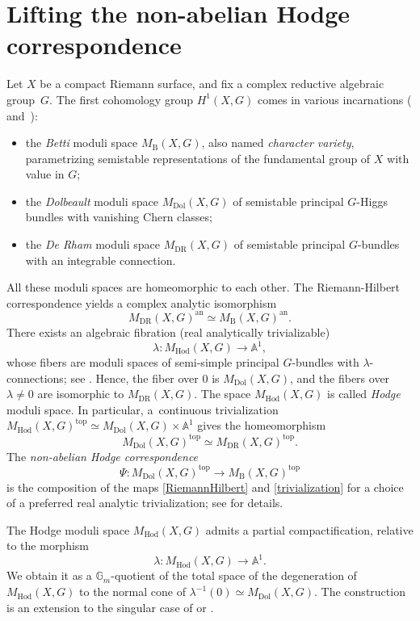\documentclass[JEP,XML,SOM,Unicode, NoEqCountersInSection,NoFloatCountersInSection,published]{cedram}
\theoremstyle{definition}
\newcommand{\Aff}{\mathbb{A}}
\newcommand{\Gm}{\mathbb{G}_m}
\newcommand{\MDolG}{{M}_{\mathrm{Dol}}(X,G)}
\newcommand{\MBG}{{M}_{\mathrm{B}}(X,G)}
\newcommand{\MDRG}{{M}_{\mathrm{DR}}(X,G)}
\newcommand{\MHodG}{{M}_{\mathrm{Hod}}(X,G)}
\begin{document}
\section{Lifting the non-abelian Hodge correspondence}\label{sec:p=wforresolution}
Let $X$ be a compact Riemann surface, and fix a complex reductive algebraic group~$G$.
The first cohomology group $H^1(X, G)$ comes in various incarnations (\cf \cite{Simpson1994I} and~\cite{Simpson1994}):
\begin{itemize}
\item the \emph{Betti} moduli space $\MBG$, also named \emph{character variety}, parametrizing semistable representations of the fundamental group of $X$ with value in $G$;
\item the \emph{Dolbeault} moduli space $\MDolG$ of semistable principal $G$-Higgs bundles with vanishing Chern classes;
\item the \emph{De Rham} moduli space $\MDRG$ of semistable principal $G$-bundles with an integrable connection.
\end{itemize}
All these moduli spaces are homeomorphic to each other. The Riemann-Hilbert correspondence yields a complex analytic isomorphism
\begin{equation}\label{RiemannHilbert}
\MDRG^{\mathrm{an}} \simeq \MBG^{\mathrm{an}}.
\end{equation}
There exists an algebraic fibration (real analytically trivializable)
\begin{equation}\label{Hodge}
\lambda\colon \MHodG \to \Aff^1,
\end{equation}
whose fibers are moduli spaces of semi-simple principal $G$-bundles with $\lambda$-con\-nections; see \cite{Simpson1997}. Hence, the fiber over $0$ is $\MDolG$, and the fibers over $\lambda \neq 0$ are isomorphic to $\MDRG$. The space $\MHodG$ is called \emph{Hodge} moduli space. In particular, a~continuous trivialization $\MHodG^{\mathrm{top}}\simeq \MDolG \times \Aff^1$ gives the homeomorphism%
\begin{equation}\label{trivialization}
\MDolG^{\mathrm{top}} \simeq \MDRG^{\mathrm{top}}.
\end{equation}
The \emph{non-abelian Hodge correspondence}
\[
\Psi\colon \MDolG^{\mathrm{top}} \to \MBG^{\mathrm{top}}
\]
is the composition of the maps \eqref{RiemannHilbert} and \eqref{trivialization} for a choice of a preferred real analytic trivialization; see \cite{Simpson1997} for details.

\label{sec:compactificationHodge}
The Hodge moduli space $\MHodG$ admits a partial compactification, relative to the morphism
\[
\lambda\colon \MHodG \to \Aff^1.
\]
We obtain it as a $\Gm$\nobreakdash-quotient of the total space of the degeneration of $\MHodG$ to the normal cone of $\lambda^{-1}(0) \simeq \MDolG$. The construction is an extension to the singular case of \cite[Lem.\,6.1]{HauselThaddeus03} or \cite[Th.\,7.2.1]{HauselLetellierRodriguez-Villegas2011}.
\end{document}
